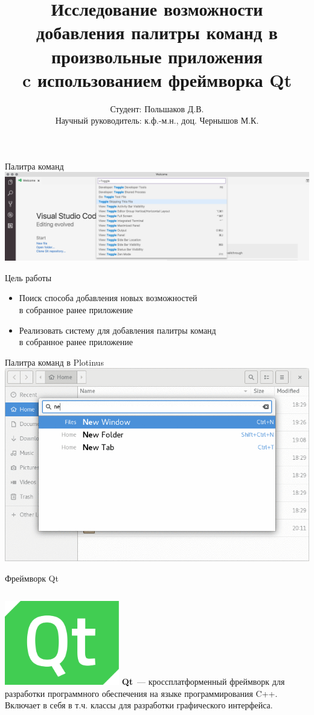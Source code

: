 \documentclass[aspectratio=1610]{beamer}
\title[Thesis]{Исследование возможности добавления палитры команд
в произвольные приложения\\c использованием фреймворка Qt}
\author{Студент: Польшаков Д.В. \\
Научный руководитель: к.ф.-м.н., доц. Чернышов М.К.}
\institute{ВГУ}
\date{\the\year}
\begin{document}
\begin{frame}[plain]
	\titlepage
\end{frame}

\begin{frame}{Палитра команд}
	\includegraphics[width=\textwidth]{vscode}
\end{frame}

\begin{frame}{Цель работы}
	\begin{itemize}
		\item Поиск способа добавления новых возможностей\\
		в собранное	ранее приложение
		\item Реализовать систему для добавления палитры команд\\
		в собранное ранее приложение
	\end{itemize}
\end{frame}

\begin{frame}{Палитра команд в Plotinus}
	\centering
	\includegraphics[height=0.9\textheight]{Plotinus}
\end{frame}

\begin{frame}{Фреймворк Qt}
    \begin{columns}
		\centering
		\includegraphics[width=5cm]{Qt}
		\textbf{Qt}~— кроссплатформенный фреймворк для разработки программного обеспечения на языке программирования C++. Включает в себя в т.ч. классы для разработки
		графического интерфейса.
	\end{columns}
\end{frame}
\end{document}
